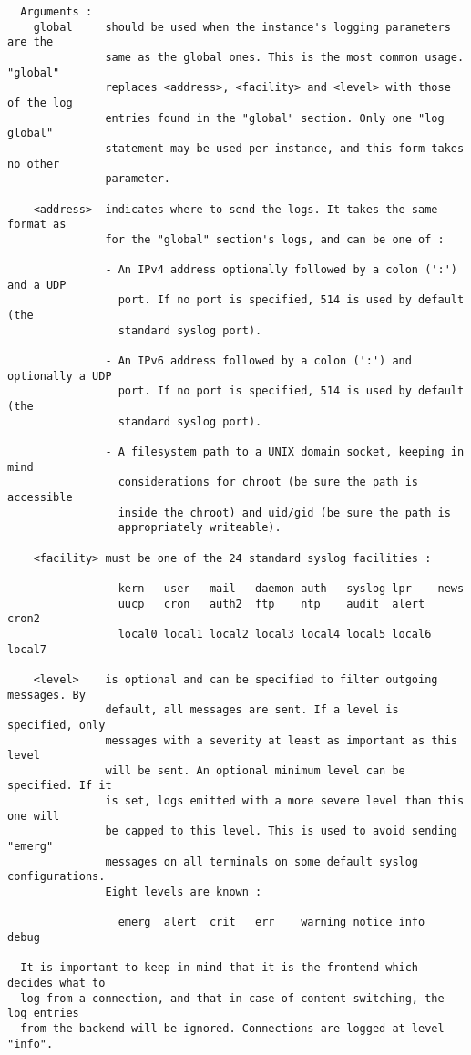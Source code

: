 \begin{verbatim}
  Arguments :
    global     should be used when the instance's logging parameters are the
               same as the global ones. This is the most common usage. "global"
               replaces <address>, <facility> and <level> with those of the log
               entries found in the "global" section. Only one "log global"
               statement may be used per instance, and this form takes no other
               parameter.

    <address>  indicates where to send the logs. It takes the same format as
               for the "global" section's logs, and can be one of :

               - An IPv4 address optionally followed by a colon (':') and a UDP
                 port. If no port is specified, 514 is used by default (the
                 standard syslog port).

               - An IPv6 address followed by a colon (':') and optionally a UDP
                 port. If no port is specified, 514 is used by default (the
                 standard syslog port).

               - A filesystem path to a UNIX domain socket, keeping in mind
                 considerations for chroot (be sure the path is accessible
                 inside the chroot) and uid/gid (be sure the path is
                 appropriately writeable).

    <facility> must be one of the 24 standard syslog facilities :

                 kern   user   mail   daemon auth   syslog lpr    news
                 uucp   cron   auth2  ftp    ntp    audit  alert  cron2
                 local0 local1 local2 local3 local4 local5 local6 local7

    <level>    is optional and can be specified to filter outgoing messages. By
               default, all messages are sent. If a level is specified, only
               messages with a severity at least as important as this level
               will be sent. An optional minimum level can be specified. If it
               is set, logs emitted with a more severe level than this one will
               be capped to this level. This is used to avoid sending "emerg"
               messages on all terminals on some default syslog configurations.
               Eight levels are known :

                 emerg  alert  crit   err    warning notice info  debug

  It is important to keep in mind that it is the frontend which decides what to
  log from a connection, and that in case of content switching, the log entries
  from the backend will be ignored. Connections are logged at level "info".


\end{verbatim}
